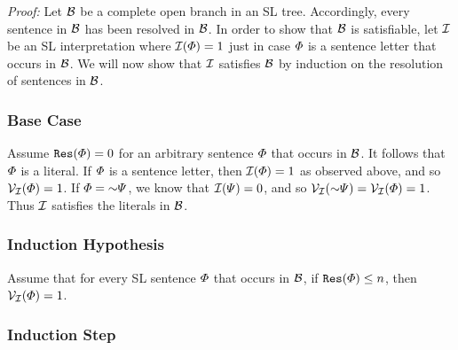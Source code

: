 \label{HintikkaLemma}

\textit{Proof:}
Let $\mathcal{B}$ be a complete open branch in an SL tree. 
Accordingly, every sentence in $\mathcal{B}$ has been resolved in $\mathcal{B}$. 
In order to show that $\mathcal{B}$ is satisfiable, let $\mathcal{I}$ be an SL interpretation where $\mathcal{I}(\varPhi)=1$ just in case $\varPhi$ is a sentence letter that occurs in $\mathcal{B}$.
We will now show that $\mathcal{I}$ satisfies $\mathcal{B}$ by induction on the resolution of sentences in $\mathcal{B}$.



\subsubsection{Base Case}

Assume $\texttt{Res}(\varPhi)=0$ for an arbitrary sentence $\varPhi$ that occurs in $\mathcal{B}$. 
It follows that $\varPhi$ is a literal.
If $\varPhi$ is a sentence letter, then $\mathcal{I}(\varPhi)=1$ as observed above, and so $\mathcal{V}_{\mathcal{I}}(\varPhi)=1$.
If $\metaA=\enot\metaB$, we know that $\mathcal{I}(\varPsi)=0$, and so $\V{\I}(\enot\metaB)=\V{\I}(\metaA)=1$.
Thus $\mathcal{I}$ satisfies the literals in $\mathcal{B}$.


\subsubsection{Induction Hypothesis}

Assume that for every SL sentence $\varPhi$ that occurs in $\mathcal{B}$, if $\texttt{Res}(\varPhi)\leq n$, then $\mathcal{V}_{\mathcal{I}}(\varPhi)=1$. 


\subsubsection{Induction Step}

